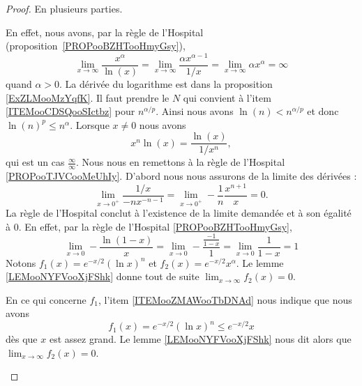 \begin{proof}
	En plusieurs parties.
	\begin{subproof}
		En effet, nous avons, par la règle de l'Hospital (proposition~\ref{PROPooBZHTooHmyGsy}),
		\begin{equation}
			\lim_{x\to\infty} \frac{ x^{\alpha} }{ \ln(x) }=\lim_{x\to\infty} \frac{ \alpha x^{\alpha-1} }{ 1/x }=\lim_{x\to\infty} \alpha x^{\alpha}=\infty
		\end{equation}
		quand \( \alpha>0\). La dérivée du logarithme est dans la proposition \ref{ExZLMooMzYqfK}.
        Il faut prendre le \( N\) qui convient à l'item \ref{ITEMooCDSQooSIctbz} pour \( n^{\alpha/p}\). Ainsi nous avons \( \ln(n)<n^{\alpha/p}\) et donc \( \ln(n)^p\leq n^{\alpha}\).
		Lorsque \( x\neq 0\) nous avons
		\begin{equation}
			x^n\ln(x)=\frac{ \ln(x) }{ 1/x^n },
		\end{equation}
		qui est un cas \( \frac{ \infty }{ \infty }\). Nous nous en remettons à la règle de l'Hospital \ref{PROPooTJVCooMeUhIy}. D'abord nous nous assurons de la limite des dérivées :
		\begin{equation}
			\lim_{x\to 0^+} \frac{ 1/x }{ -nx^{-n-1} }=\lim_{x\to 0^+} -\frac{1}{ n }\frac{ x^{n+1} }{ x }=0.
		\end{equation}
		La règle de l'Hospital conclut à l'existence de la limite demandée et à son égalité à \( 0\).
		En effet, par la règle de l'Hospital \ref{PROPooBZHTooHmyGsy},
		\begin{equation}    \label{EqGICpOX}
			\lim_{x\to 0} -\frac{ \ln(1-x) }{ x }=\lim_{x\to 0} -\frac{ \frac{ -1 }{ 1-x } }{ 1 }=\lim_{x\to 0} \frac{1}{ 1-x }=1
		\end{equation}
        Notons \( f_1(x)= e^{-x/2}(\ln x)^n\) et \( f_2(x)= e^{-x/2}x^{\alpha}\). Le lemme \ref{LEMooNYFVooXjFShk} donne tout de suite \( \lim_{x\to \infty} f_2(x)=0\).

        En ce qui concerne \( f_1\), l'item \ref{ITEMooZMAWooTbDNAd} nous indique que nous avons
        \begin{equation}
            f_1(x)= e^{-x/2}(\ln x)^n\leq  e^{-x/2}x
        \end{equation}
        dès que \( x\) est assez grand. Le lemme \ref{LEMooNYFVooXjFShk} nous dit alors que \( \lim_{x\to \infty} f_2(x)=0\).


\end{subproof}
\end{proof}
